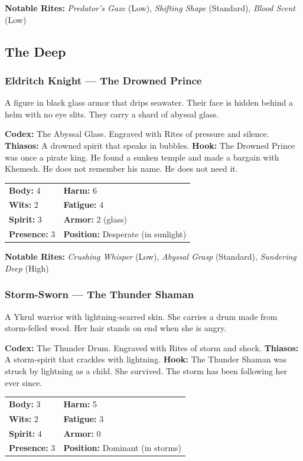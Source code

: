 \textbf{Notable Rites:} \textit{Predator's Gaze} (Low), \textit{Shifting Shape} (Standard), \textit{Blood Scent} (Low)

\subsection{The Deep}

\subsubsection{Eldritch Knight — The Drowned Prince}

A figure in black glass armor that drips seawater. Their face is hidden behind a helm with no eye slits. They carry a shard of abyssal glass.

\textbf{Codex:} The Abyssal Glass. Engraved with Rites of pressure and silence.
\textbf{Thiasos:} A drowned spirit that speaks in bubbles.
\textbf{Hook:} The Drowned Prince was once a pirate king. He found a sunken temple and made a bargain with Khemesh. He does not remember his name. He does not need it.

\begin{tabular}{ll}
\textbf{Body:} 4 & \textbf{Harm:} 6 \\
\textbf{Wits:} 2 & \textbf{Fatigue:} 4 \\
\textbf{Spirit:} 3 & \textbf{Armor:} 2 (glass) \\
\textbf{Presence:} 3 & \textbf{Position:} Desperate (in sunlight) \\
\end{tabular}

\textbf{Notable Rites:} \textit{Crushing Whisper} (Low), \textit{Abyssal Grasp} (Standard), \textit{Sundering Deep} (High)

\subsubsection{Storm-Sworn — The Thunder Shaman}

A Ykrul warrior with lightning-scarred skin. She carries a drum made from storm-felled wood. Her hair stands on end when she is angry.

\textbf{Codex:} The Thunder Drum. Engraved with Rites of storm and shock.
\textbf{Thiasos:} A storm-spirit that crackles with lightning.
\textbf{Hook:} The Thunder Shaman was struck by lightning as a child. She survived. The storm has been following her ever since.

\begin{tabular}{ll}
\textbf{Body:} 3 & \textbf{Harm:} 5 \\
\textbf{Wits:} 2 & \textbf{Fatigue:} 3 \\
\textbf{Spirit:} 4 & \textbf{Armor:} 0 \\
\textbf{Presence:} 3 & \textbf{Position:} Dominant (in storms) \\
\end{tabular}

